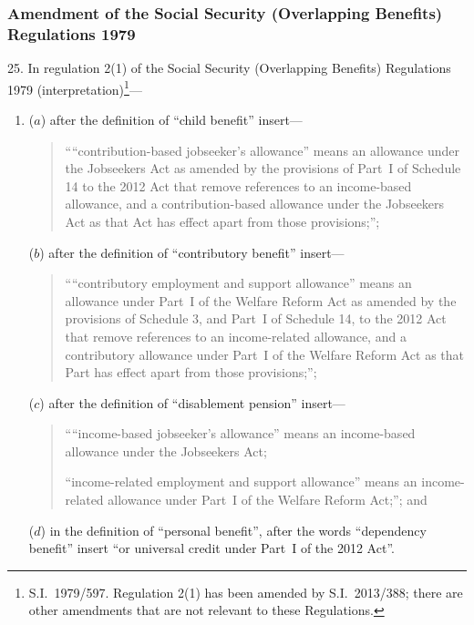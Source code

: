 \documentclass[12pt,a4paper]{article}
\begin{document}
\subsubsection[25. Amendment of the Social Security (Overlapping Benefits) Regulations 1979]{Amendment of the Social Security (Overlapping Benefits) Regulations 1979}

25.  In regulation 2(1) of the Social Security (Overlapping Benefits) Regulations 1979 (interpretation)\footnote{S.I.~1979/597. Regulation 2(1) has been amended by S.I.~2013/388; there are other amendments that are not relevant to these Regulations.}—
\begin{enumerate}\item[]
($a$) after the definition of “child benefit” insert—
\begin{quotation}
““contribution-based jobseeker’s allowance” means an allowance under the Jobseekers Act as amended by the provisions of Part~I of Schedule 14 to the 2012 Act that remove references to an income-based allowance, and a contribution-based allowance under the Jobseekers Act as that Act has effect apart from those provisions;”;
\end{quotation}

($b$) after the definition of “contributory benefit” insert—
\begin{quotation}
““contributory employment and support allowance” means an allowance under Part~I of the Welfare Reform Act as amended by the provisions of Schedule 3, and Part~I of Schedule 14, to the 2012 Act that remove references to an income-related allowance, and a contributory allowance under Part~I of the Welfare Reform Act as that Part has effect apart from those provisions;”;
\end{quotation}

($c$) after the definition of “disablement pension” insert—
\begin{quotation}
““income-based jobseeker’s allowance” means an income-based allowance under the Jobseekers Act;

\begin{sloppypar}
“income-related employment and support allowance” means an income-related allowance under Part~I of the Welfare Reform Act;”; and
\end{sloppypar}
\end{quotation}

($d$) in the definition of “personal benefit”, after the words “dependency benefit” insert “or universal credit under Part~I of the 2012 Act”.
\end{enumerate}
\end{document}
